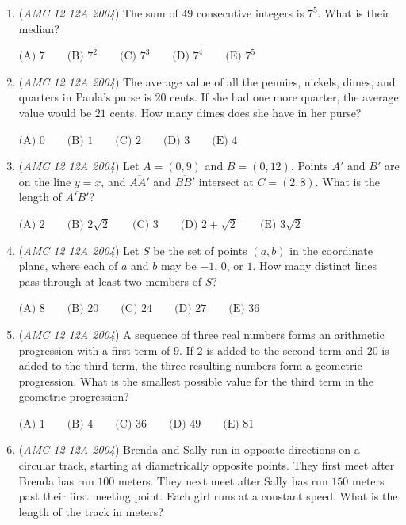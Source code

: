 \begin{enumerate}
	\item (\textit{AMC 12 12A 2004}) The sum of $49$ consecutive integers is $7^5$. What is their median?


 $\text {(A) } 7 \qquad \text {(B) } 7^2\qquad \text {(C) } 7^3\qquad \text {(D) } 7^4\qquad \text {(E) }7^5$


	\item (\textit{AMC 12 12A 2004}) The average value of all the pennies, nickels, dimes, and quarters in Paula's purse is $20$ cents. If she had one more quarter, the average value would be $21$ cents. How many dimes does she have in her purse?


 $\text {(A) }0 \qquad \text {(B) } 1 \qquad \text {(C) } 2 \qquad \text {(D) } 3\qquad \text {(E) }4$


	\item (\textit{AMC 12 12A 2004}) Let $A = (0,9)$ and $B = (0,12)$. Points $A'$ and $B'$ are on the line $y = x$, and $\overline{AA'}$ and $\overline{BB'}$ intersect at $C = (2,8)$. What is the length of $\overline{A'B'}$?


 $\text {(A) } 2 \qquad \text {(B) } 2\sqrt2 \qquad \text {(C) } 3 \qquad \text {(D) } 2 + \sqrt 2\qquad \text {(E) }3\sqrt 2$


	\item (\textit{AMC 12 12A 2004}) Let $S$ be the set of points $(a,b)$ in the coordinate plane, where each of $a$ and $b$ may be $- 1$, $0$, or $1$. How many distinct lines pass through at least two members of $S$?


 $\text {(A) } 8 \qquad \text {(B) } 20 \qquad \text {(C) } 24 \qquad \text {(D) } 27\qquad \text {(E) }36$


	\item (\textit{AMC 12 12A 2004}) A sequence of three real numbers forms an arithmetic progression with a first term of $9$. If $2$ is added to the second term and $20$ is added to the third term, the three resulting numbers form a geometric progression. What is the smallest possible value for the third term in the geometric progression?


 $\text {(A) } 1 \qquad \text {(B) } 4 \qquad \text {(C) } 36 \qquad \text {(D) } 49 \qquad \text {(E) }81$


	\item (\textit{AMC 12 12A 2004}) Brenda and Sally run in opposite directions on a circular track, starting at diametrically opposite points. They first meet after Brenda has run $100$ meters. They next meet after Sally has run $150$ meters past their first meeting point. Each girl runs at a constant speed. What is the length of the track in meters?



\end{enumerate}
